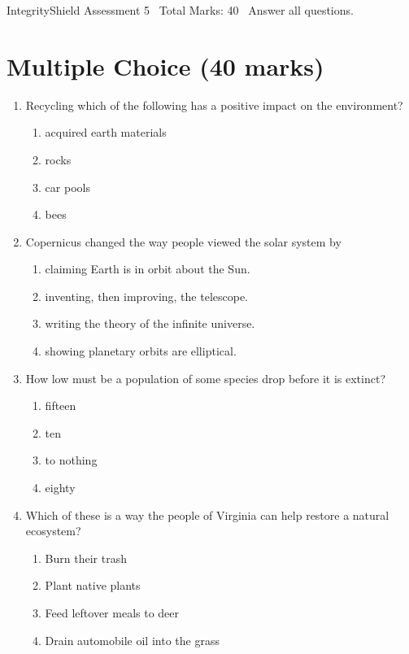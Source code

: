 \documentclass[12pt]{article}
\begin{document}
\begin{center}
IntegrityShield Assessment 5 \
Total Marks: 40 \
Answer all questions.
\end{center}

\section*{Multiple Choice (40 marks)}
\begin{enumerate}[label=\arabic*.]
\item Recycling which of the following has a positive impact on the environment?
\begin{enumerate}[label=(\alph*)]
    \item acquired earth materials
    \item rocks
    \item car pools
    \item bees
\end{enumerate}
\item Copernicus changed the way people viewed the solar system by
\begin{enumerate}[label=(\alph*)]
    \item claiming Earth is in orbit about the Sun.
    \item inventing, then improving, the telescope.
    \item writing the theory of the infinite universe.
    \item showing planetary orbits are elliptical.
\end{enumerate}
\item How low must be a population of some species drop before it is extinct?
\begin{enumerate}[label=(\alph*)]
    \item fifteen
    \item ten
    \item to nothing
    \item eighty
\end{enumerate}
\item Which of these is a way the people of Virginia can help restore a natural ecosystem?
\begin{enumerate}[label=(\alph*)]
    \item Burn their trash
    \item Plant native plants
    \item Feed leftover meals to deer
    \item Drain automobile oil into the grass
\end{enumerate}

\end{enumerate}
\end{document}
